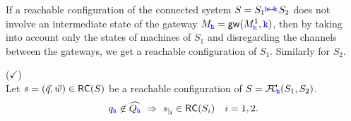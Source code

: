 If a reachable configuration of the connected system $S={S_{1}}\stackrel{\hspace{-3pt}{ \ensuremath{\mathtt{\color{blue}{ {h}}}} }\!\leftrightarrow\!{\mathtt{\color{blue}{ {k}}}}\!}{} {S_{2}}$ does not involve an intermediate state of the gateway
$M_{\mathtt{\color{blue}{ {h}}}} = \mathsf{gw}(M^1_{\mathtt{\color{blue}{ {h}}}}, {\mathtt{\color{blue}{ {k}}}})$, %
then by taking into account only the states of machines of $S_1$ and disregarding
the channels between the gateways, %
we get a
reachable configuration of $S_1$. Similarly for $S_2$.

\begin{lemma}($\checkmark$)
\label{lem:nohatrestrict}\hfill\\
Let $s= (\vec{q},\vec{w}) \in \mathsf{RC}(S)$ be a reachable configuration of 
$S ={\mathcal{F}\!\mathcal{C}}_{\!{\mathtt{\color{blue}{ {h}}}}}(S_1,S_2)$.
$${q}_{\mathtt{\color{blue}{ {h}}}}\not\in\widehat{Q_{\mathtt{\color{blue}{ {h}}}}} ~\Rightarrow~ 
{s}_{\mid_{\mathbf{i}}}\in \mathsf{RC}(S_i) \quad i=1,2.$$
\end{lemma}

